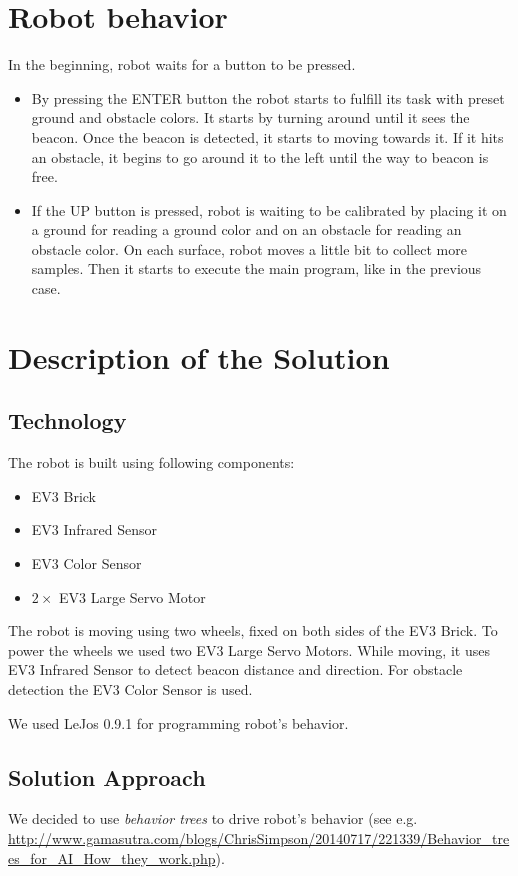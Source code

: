 \documentclass[a4paper]{article}
\begin{document}
\section*{Robot behavior}
In the beginning, robot waits for a button to be pressed. 

\begin{itemize}
\item By pressing the ENTER button the robot starts to fulfill its task with preset ground and obstacle colors. It starts by turning around until it sees the beacon. Once the beacon is detected, it starts to moving towards it. If it hits an obstacle, it begins to go around it to the left until the way to beacon is free.
\item If the UP button is pressed, robot is waiting to be calibrated by placing it on a ground for reading a ground color and on an obstacle for reading an obstacle color. On each surface, robot moves a little bit to collect more samples. Then it starts to execute the main program, like in the previous case.
\end{itemize}


\section*{Description of the Solution}

\subsection*{Technology}
The robot is built using following components:
\begin{itemize}
\item EV3 Brick
\item EV3 Infrared Sensor
\item EV3 Color Sensor
\item $2\times$ EV3 Large Servo Motor
\end{itemize}

The robot is moving using two wheels, fixed on both sides of the EV3 Brick. To power the wheels we used two EV3 Large Servo Motors. While moving, it uses EV3 Infrared Sensor to detect beacon distance and direction. For obstacle detection the EV3 Color Sensor is used.

\smallskip
We used LeJos 0.9.1 for programming robot's behavior. 

\subsection*{Solution Approach}
We decided to use \textit{behavior trees} to drive robot's behavior (see e.g. \url{http://www.gamasutra.com/blogs/ChrisSimpson/20140717/221339/Behavior_trees_for_AI_How_they_work.php}).
\end{document}
